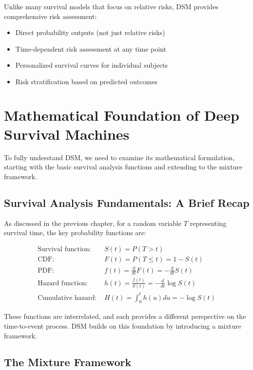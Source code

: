 Unlike many survival models that focus on relative risks, DSM provides comprehensive risk assessment:
\begin{itemize}
    \item Direct probability outputs (not just relative risks)
    \item Time-dependent risk assessment at any time point
    \item Personalized survival curves for individual subjects
    \item Risk stratification based on predicted outcomes
\end{itemize}

\section{Mathematical Foundation of Deep Survival Machines}

To fully understand DSM, we need to examine its mathematical formulation, starting with the basic survival analysis functions and extending to the mixture framework.

\subsection{Survival Analysis Fundamentals: A Brief Recap}

As discussed in the previous chapter, for a random variable $T$ representing survival time, the key probability functions are:

\begin{equationbox}[title=Core Survival Functions]
\begin{align}
    \text{Survival function: } & S(t) = P(T > t) \\
    \text{CDF: } & F(t) = P(T \leq t) = 1 - S(t) \\
    \text{PDF: } & f(t) = \frac{d}{dt}F(t) = -\frac{d}{dt}S(t) \\
    \text{Hazard function: } & h(t) = \frac{f(t)}{S(t)} = -\frac{d}{dt}\log S(t) \\
    \text{Cumulative hazard: } & H(t) = \int_0^t h(u) du = -\log S(t)
\end{align}
\end{equationbox}

These functions are interrelated, and each provides a different perspective on the time-to-event process. DSM builds on this foundation by introducing a mixture framework.

\subsection{The Mixture Framework}

